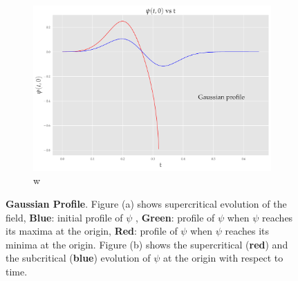 \begin{figure}
    \begin{subfigure}[b]{0.85\textwidth}
        \includegraphics[width=1\linewidth]{images/at0_Gaussian.pdf}w
        \caption{}
        \label{fig:Ng2}
    \end{subfigure}
    \caption[Evolution of $\psi$ from an initial Gaussian profile]{\textbf{Gaussian Profile}. Figure (a) shows supercritical evolution of the field, \textbf{Blue}: initial profile of $\psi$ , \textbf{Green}: profile of $\psi$ when $\psi$ reaches its maxima at the origin, \textbf{Red}: profile of $\psi$ when $\psi$ reaches its minima at the origin. Figure (b) shows the supercritical (\textbf{red}) and the subcritical (\textbf{blue}) evolution of $\psi$ at the origin with respect to time.}
\end{figure}



